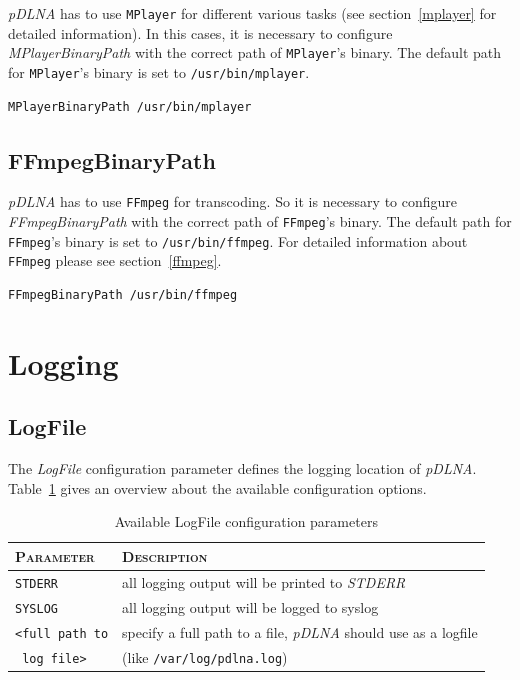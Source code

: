 \documentclass[a4paper,oneside,10pt]{report}
\newenvironment{colframefile}{%
  \begin{Sbox}
    \begin{minipage}{.99\columnwidth}
}{%
  \end{minipage}
  \end{Sbox}
  \begin{center}
    \fcolorbox{black}{Yellow}{\TheSbox}
  \end{center}
}
\begin{document}
{\em pDLNA} has to use \verb|MPlayer| for different various tasks (see section~\ref{mplayer} for detailed information). In this cases, it is necessary to configure {\em MPlayerBinaryPath} with the correct path of \verb|MPlayer|'s binary. The default path for \verb|MPlayer|'s binary is set to \verb|/usr/bin/mplayer|.

\begin{colframefile}
\begin{verbatim}
MPlayerBinaryPath /usr/bin/mplayer
\end{verbatim}
\end{colframefile}

\subsection{FFmpegBinaryPath}

{\em pDLNA} has to use \verb|FFmpeg| for transcoding. So it is necessary to configure {\em FFmpegBinaryPath} with the correct path of \verb|FFmpeg|'s binary. The default path for \verb|FFmpeg|'s binary is set to \verb|/usr/bin/ffmpeg|. For detailed information about \verb|FFmpeg| please see section~\ref{ffmpeg}.

\begin{colframefile}
\begin{verbatim}
FFmpegBinaryPath /usr/bin/ffmpeg
\end{verbatim}
\end{colframefile}

\section{Logging}

\subsection{LogFile}

The {\em LogFile} configuration parameter defines the logging location of {\em pDLNA}. Table~\ref{tab:AvailableLogFileparams} gives an overview about the available configuration options.

\begin{table}
	\centering
	\begin{tabular}{|p{7em}|p{25em}|}
		\hline
		\textsc{Parameter} & \textsc{Description}\\
		\hline
		\hline
		\verb|STDERR| & all logging output will be printed to {\em STDERR} \\
		\hline
		\verb|SYSLOG| & all logging output will be logged to syslog \\
		\hline
		\verb|<full path to| & specify a full path to a file, {\em pDLNA} should use as a logfile\\
		\verb| log file>| &  (like \verb|/var/log/pdlna.log|) \\
		\hline
	\end{tabular}
	\caption{Available LogFile configuration parameters}
	\label{tab:AvailableLogFileparams}
\end{table}
\end{document}
